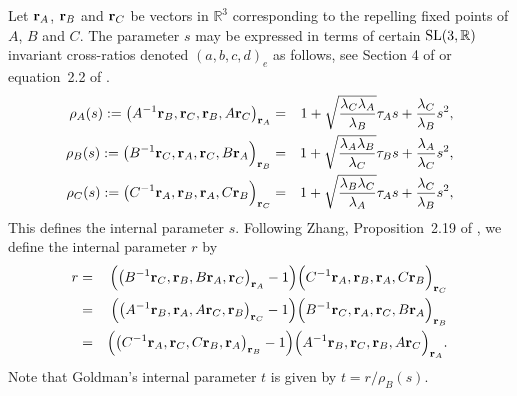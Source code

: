 \documentclass[11pt]{amsart}
\numberwithin{equation}{section}
\begin{document}
Let ${\bf r}_A$, ${\bf r}_B$ and ${\bf r}_C$ be vectors in ${\mathbb R}^3$ corresponding to the repelling fixed points 
of $A$, $B$ and $C$. The parameter $s$ may be expressed in terms of certain ${\rm SL}(3,{\mathbb R})$ invariant
cross-ratios denoted $(a,b,c,d)_e$ as follows, see Section 4 of \cite{Gol} or equation~2.2 of \cite{Zhang2}.
\begin{eqnarray*}
\rho_A(s) := \bigl(A^{-1}{\bf r}_B,{\bf r}_C,{\bf r}_B,A{\bf r}_C\bigr)_{{\bf r}_A}
& = & 1+\sqrt{\frac{\lambda_C\lambda_A}{\lambda_B}}\tau_As+\frac{\lambda_C}{\lambda_B}s^2, \\
\rho_B(s) := \bigl(B^{-1}{\bf r}_C,{\bf r}_A,{\bf r}_C,B{\bf r}_A\Bigr)_{{\bf r}_B}
& = & 1+\sqrt{\frac{\lambda_A\lambda_B}{\lambda_C}}\tau_Bs+\frac{\lambda_A}{\lambda_C}s^2, \\
\rho_C(s) := \bigl(C^{-1}{\bf r}_A,{\bf r}_B,{\bf r}_A,C{\bf r}_B\Bigr)_{{\bf r}_C}
& = & 1+\sqrt{\frac{\lambda_B\lambda_C}{\lambda_A}}\tau_As+\frac{\lambda_C}{\lambda_B}s^2, \\
\end{eqnarray*}
This defines the internal parameter $s$. Following Zhang, Proposition~2.19 of \cite{Zhang2}, we define
the internal parameter $r$ by 
\begin{eqnarray*}
r & = & \Bigl(\bigl(B^{-1}{\bf r}_C,{\bf r}_B,B{\bf r}_A,{\bf r}_C\bigr)_{{\bf r}_A}-1\Bigr)
\Bigl(C^{-1}{\bf r}_A,{\bf r}_B,{\bf r}_A,C{\bf r}_B\Bigr)_{{\bf r}_C} \\
& = & \Bigl(\bigl(A^{-1}{\bf r}_B,{\bf r}_A,A{\bf r}_C,{\bf r}_B\bigr)_{{\bf r}_C}-1\Bigr)
\Bigl(B^{-1}{\bf r}_C,{\bf r}_A,{\bf r}_C,B{\bf r}_A\Bigr)_{{\bf r}_B} \\
& = & \Bigl(\bigl(C^{-1}{\bf r}_A,{\bf r}_C,C{\bf r}_B,{\bf r}_A\bigr)_{{\bf r}_B}-1\Bigr)
\Bigl(A^{-1}{\bf r}_B,{\bf r}_C,{\bf r}_B,A{\bf r}_C\Bigr)_{{\bf r}_A}.
\end{eqnarray*}
Note that Goldman's internal parameter $t$ is given by $t=r/\rho_B(s)$.
\end{document}
